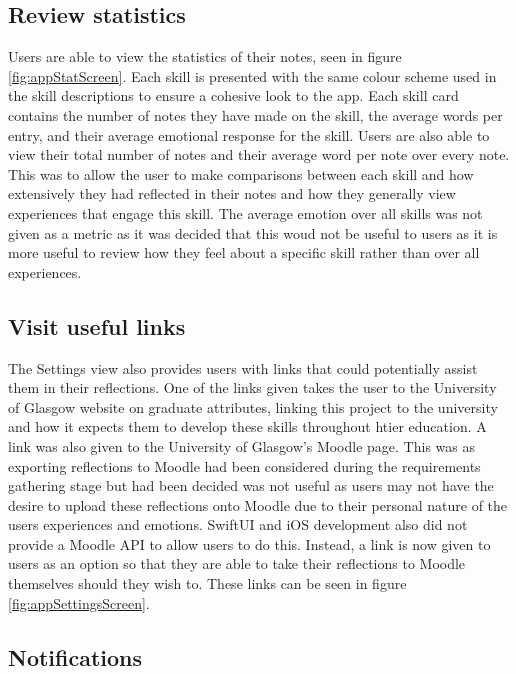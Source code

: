 \documentclass{l4proj}
\begin{document}
\subsection{Review statistics}

Users are able to view the statistics of their notes, seen in figure \ref{fig:appStatScreen}. Each skill is presented with the same colour scheme used in the skill descriptions to ensure a cohesive look to the app. Each skill card contains the number of notes they have made on the skill, the average words per entry, and their average emotional response for the skill. Users are also able to view their total number of notes and their average word per note over every note. This was to allow the user to make comparisons between each skill and how extensively they had reflected in their notes and how they generally view experiences that engage this skill. The average emotion over all skills was not given as a metric as it was decided that this woud not be useful to users as it is more useful to review how they feel about a specific skill rather than over all experiences. 

\subsection{Visit useful links}

The Settings view also provides users with links that could potentially assist them in their reflections. One of the links given takes the user to the University of Glasgow website on graduate attributes, linking this project to the university and how it expects them to develop these skills throughout htier education. A link was also given to the University of Glasgow's Moodle page. This was as exporting reflections to Moodle had been considered during the requirements gathering stage but had been decided was not useful as users may not have the desire to upload these reflections onto Moodle due to their personal nature of the users experiences and emotions. SwiftUI and iOS development also did not provide a Moodle API to allow users to do this. Instead, a link is now given to users as an option so that they are able to take their reflections to Moodle themselves should they wish to. These links can be seen in figure \ref{fig:appSettingsScreen}.

\subsection{Notifications}
\end{document}
